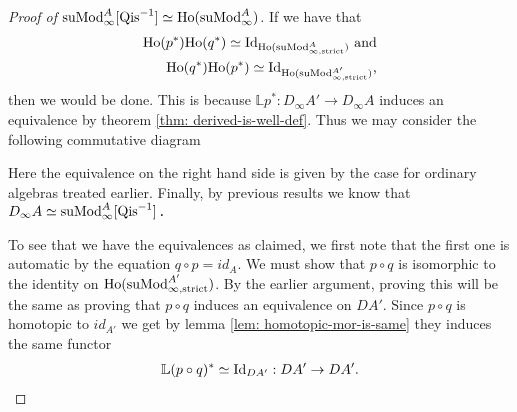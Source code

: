 \documentclass[../thesis.tex]{subfiles}
\begin{document}
\begin{proof}[Proof of $\tt{suMod}_\infty^A{[\tt{Qis}^{-1}]} \simeq \tt{Ho}(\tt{suMod}_\infty^A)$]
                 If we have that 
                 \begin{align*}
                    \tt{Ho}(p^*)\tt{Ho}(q^*) \simeq \tt{Id}_{\tt{Ho}(\tt{suMod}_{\infty,\tt{strict}}^A)}\tt{ and} \\
                    \tt{Ho}(q^*)\tt{Ho}(p^*) \simeq \tt{Id}_{\tt{Ho}(\tt{suMod}_{\infty,\tt{strict}}^{A'})}\tt{,}
                 \end{align*}
                 then we would be done. This is because $\mathbb{L}p^* : D_\infty A' \rightarrow D_\infty A$ induces an equivalence by theorem \ref{thm: derived-is-well-def}. Thus we may consider the following commutative diagram
                 \begin{center}
                 \end{center}
                 Here the equivalence on the right hand side is given by the case for ordinary algebras treated earlier. Finally, by previous results we know that $D_\infty A \simeq \tt{suMod}_{\infty}^A[\tt{Qis}^{-1}]$\tt{.}
                 
                 To see that we have the equivalences as claimed, we first note that the first one is automatic by the equation $q\circ p = id_A$. We must show that $p\circ q$ is isomorphic to the identity on $\tt{Ho}(\tt{suMod}_{\infty,\tt{strict}}^{A'})$. By the earlier argument, proving this will be the same as proving that $p\circ q$ induces an equivalence on $DA'$. Since $p\circ q$ is homotopic to $id_{A'}$ we get by lemma \ref{lem: homotopic-mor-is-same} they induces the same functor
                 \begin{align*}
                    \mathbb{L}(p\circ q)^* \simeq \tt{Id}_{DA'} : DA' \rightarrow DA'\tt{.}
                \end{align*}
            \end{proof}
\end{document}
